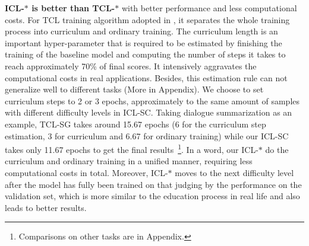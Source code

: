 \textbf{ICL-$\ast$ is better than TCL-$\ast$} with better performance and less computational costs. For TCL training algorithm adopted in \citet{liang-etal-2021-token-wise}, it separates the whole training process into curriculum and ordinary training. The curriculum length is an important hyper-parameter that is required to be estimated by finishing the training of the baseline model and computing the number of steps it takes to reach approximately 70\% of final scores. It intensively aggravates the computational costs in real applications. Besides, this estimation rule can not generalize well to different tasks (More in Appendix). We choose to set curriculum steps to 2 or 3 epochs, approximately to the same amount of samples with different difficulty levels in ICL-SC. Taking dialogue summarization as an example, TCL-SG takes around 15.67 epochs (6 for the curriculum step estimation, 3 for curriculum and 6.67 for ordinary training) while our ICL-SC takes only 11.67 epochs to get the final results~\footnote{Comparisons on other tasks are in Appendix.}. In a word, our ICL-$\ast$ do the curriculum and ordinary training in a unified manner, requiring less computational costs in total.
Moreover, ICL-$\ast$ moves to the next difficulty level after the model has fully been trained on that judging by the performance on the validation set, which is more similar to the education process in real life and also leads to better results.





